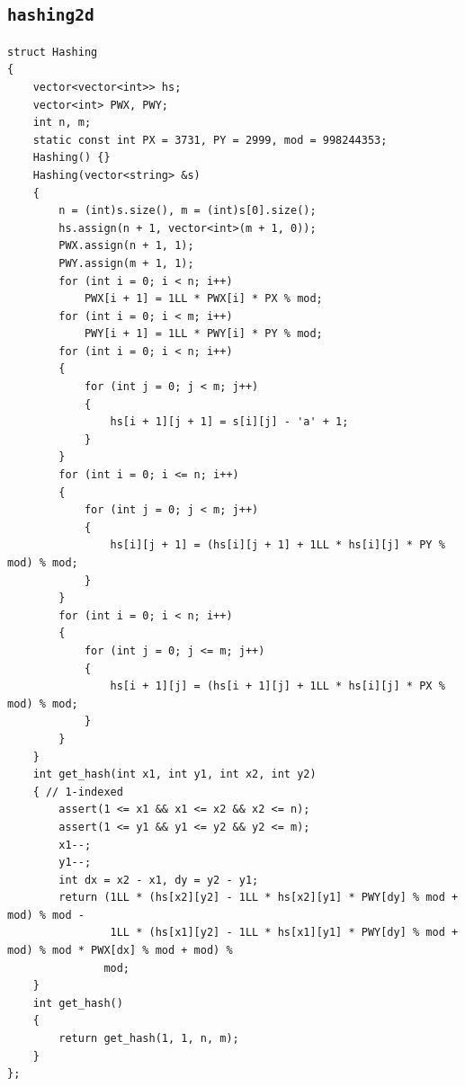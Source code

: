 \subsection{\texttt{hashing2d}}
\begin{lstlisting}
struct Hashing
{
    vector<vector<int>> hs;
    vector<int> PWX, PWY;
    int n, m;
    static const int PX = 3731, PY = 2999, mod = 998244353;
    Hashing() {}
    Hashing(vector<string> &s)
    {
        n = (int)s.size(), m = (int)s[0].size();
        hs.assign(n + 1, vector<int>(m + 1, 0));
        PWX.assign(n + 1, 1);
        PWY.assign(m + 1, 1);
        for (int i = 0; i < n; i++)
            PWX[i + 1] = 1LL * PWX[i] * PX % mod;
        for (int i = 0; i < m; i++)
            PWY[i + 1] = 1LL * PWY[i] * PY % mod;
        for (int i = 0; i < n; i++)
        {
            for (int j = 0; j < m; j++)
            {
                hs[i + 1][j + 1] = s[i][j] - 'a' + 1;
            }
        }
        for (int i = 0; i <= n; i++)
        {
            for (int j = 0; j < m; j++)
            {
                hs[i][j + 1] = (hs[i][j + 1] + 1LL * hs[i][j] * PY % mod) % mod;
            }
        }
        for (int i = 0; i < n; i++)
        {
            for (int j = 0; j <= m; j++)
            {
                hs[i + 1][j] = (hs[i + 1][j] + 1LL * hs[i][j] * PX % mod) % mod;
            }
        }
    }
    int get_hash(int x1, int y1, int x2, int y2)
    { // 1-indexed
        assert(1 <= x1 && x1 <= x2 && x2 <= n);
        assert(1 <= y1 && y1 <= y2 && y2 <= m);
        x1--;
        y1--;
        int dx = x2 - x1, dy = y2 - y1;
        return (1LL * (hs[x2][y2] - 1LL * hs[x2][y1] * PWY[dy] % mod + mod) % mod -
                1LL * (hs[x1][y2] - 1LL * hs[x1][y1] * PWY[dy] % mod + mod) % mod * PWX[dx] % mod + mod) %
               mod;
    }
    int get_hash()
    {
        return get_hash(1, 1, n, m);
    }
};
\end{lstlisting}


